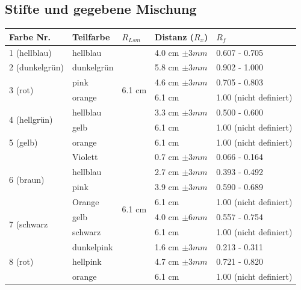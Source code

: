 \documentclass[11pt,paper=a4,final]{scrartcl}
\begin{document}
\subsection{Stifte und gegebene Mischung}
\begin{savenotes} %
  \begin{table}[ht!]
    \centering
    \begin{tabular}{|l|l|l|l|l|}
      \hline
    \bf Farbe Nr.	& \bf Teilfarbe	& \bf \(R_{Lsm}\)		& \bf Distanz (\(R_x\))	& \bf \(R_f\)		\\ \hline
      1 (hellblau)	& hellblau	& \multirow{6}{*}{6.1 cm }	& 4.0 cm \(\pm 3 mm \)	& 0.607 - 0.705		\\ \cline{1-2} \cline{4-5}
      2 (dunkelgr\"un)	& dunkelgr\"un	&				& 5.8 cm \(\pm 3 mm \)	& 0.902 - 1.000		\\ \cline{1-2} \cline{4-5}
      \multirow{2}{*}{3 (rot) }
			& pink		&				& 4.6 cm \(\pm 3 mm \)	& 0.705 - 0.803		\\ 
			& orange	&				& 6.1 cm 		& 1.00 (nicht definiert)\\ \cline{1-2} \cline{4-5}
      \multirow{2}{*}{4 (hellgr\"un) }
 			& hellblau	&				& 3.3 cm \(\pm 3 mm \)	& 0.500 - 0.600		\\
			& gelb		&				& 6.1 cm		& 1.00 (nicht definiert)\\ \hline
      5 (gelb)		& orange	& \multirow{10}{*}{6.1 cm }	& 6.1 cm		& 1.00 (nicht definiert)\\ \cline{1-2} \cline{4-5}
      \multirow{4}{*}{6 (braun)}
			& Violett	&				& 0.7 cm \(\pm 3 mm \)	& 0.066 - 0.164		\\
			& hellblau	&				& 2.7 cm \(\pm 3 mm \)	& 0.393 - 0.492		\\
      			& pink		&				& 3.9 cm \(\pm 3 mm \)	& 0.590 - 0.689		\\
      			& Orange	&				& 6.1 cm 		& 1.00 (nicht definiert)\\ \cline{1-2} \cline{4-5}
      \multirow{2}{*}{7 (schwarz}
      			& gelb		&				& 4.0 cm \(\pm 6 mm \)	& 0.557 - 0.754		\\
      			& schwarz	&				& 6.1 cm		& 1.00 (nicht definiert)\\ \cline{1-2} \cline{4-5}
      \multirow{3}{*}{8 (rot)}
      			& dunkelpink	& 				& 1.6 cm \(\pm 3 mm \)	& 0.213 - 0.311		\\ 
      			& hellpink	&				& 4.7 cm \(\pm 3 mm \)	& 0.721 - 0.820		\\
      			& orange	&				& 6.1 cm		& 1.00 (nicht definiert)\\ \hline

\end{tabular}
\end{table}
\end{savenotes}
\end{document}
